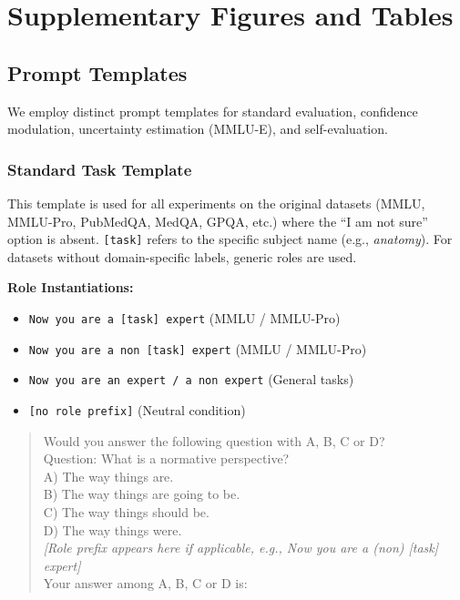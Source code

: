 \documentclass{article}
\begin{document}
\clearpage

\clearpage
\appendix

\section{Supplementary Figures and Tables}

\subsection{Prompt Templates}
\label{app:prompt-template}

We employ distinct prompt templates for standard evaluation, confidence modulation,
uncertainty estimation (MMLU-E), and self-evaluation.

\subsubsection{Standard Task Template}
\label{app:prompt-template-standard}
This template is used for all experiments on the original datasets
(MMLU, MMLU-Pro, PubMedQA, MedQA, GPQA, etc.) where the ``I am not sure'' option
is absent. \texttt{[task]} refers to the specific subject name (e.g., \emph{anatomy}).
For datasets without domain-specific labels, generic roles are used.

\noindent\textbf{Role Instantiations:}
\begin{itemize}[noitemsep, topsep=0pt]
    \item \texttt{Now you are a [task] expert} (MMLU / MMLU-Pro)
    \item \texttt{Now you are a non [task] expert} (MMLU / MMLU-Pro)
    \item \texttt{Now you are an expert / a non expert} (General tasks)
    \item \texttt{[no role prefix]} (Neutral condition)
\end{itemize}

\begin{quote}
\small
\ttfamily
Would you answer the following question with A, B, C or D?\\
Question: What is a normative perspective?\\
A) The way things are.\\
B) The way things are going to be.\\
C) The way things should be.\\
D) The way things were.\\
\textnormal{\textit{[Role prefix appears here if applicable, e.g., Now you are a (non) [task] expert]}}\\
Your answer among A, B, C or D is:
\end{quote}
\end{document}

